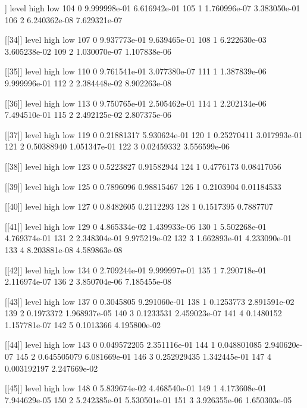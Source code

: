 \documentclass[letterpaper,10pt]{amsart}
\newenvironment{verbatimcode}{\bigskip \scriptsize \verbatim}{\endverbatim \normalsize \bigskip}
\begin{document}
\begin{enumerate}[(1)]
\begin{verbatimcode}
[[33]]
    level         high          low
104     0 9.999998e-01 6.616942e-01
105     1 1.760996e-07 3.383050e-01
106     2 6.240362e-08 7.629321e-07

[[34]]
    level         high          low
107     0 9.937773e-01 9.639465e-01
108     1 6.222630e-03 3.605238e-02
109     2 1.030070e-07 1.107838e-06

[[35]]
    level         high          low
110     0 9.761541e-01 3.077380e-07
111     1 1.387839e-06 9.999996e-01
112     2 2.384448e-02 8.902263e-08

[[36]]
    level         high          low
113     0 9.750765e-01 2.505462e-01
114     1 2.202134e-06 7.494510e-01
115     2 2.492125e-02 2.807375e-06

[[37]]
    level       high          low
119     0 0.21881317 5.930624e-01
120     1 0.25270411 3.017993e-01
121     2 0.50388940 1.051347e-01
122     3 0.02459332 3.556599e-06

[[38]]
    level      high        low
123     0 0.5223827 0.91582944
124     1 0.4776173 0.08417056

[[39]]
    level      high        low
125     0 0.7896096 0.98815467
126     1 0.2103904 0.01184533

[[40]]
    level      high       low
127     0 0.8482605 0.2112293
128     1 0.1517395 0.7887707

[[41]]
    level         high          low
129     0 4.865334e-02 1.439933e-06
130     1 5.502268e-01 4.769374e-01
131     2 2.348304e-01 9.975219e-02
132     3 1.662893e-01 4.233090e-01
133     4 8.203881e-08 4.589863e-08

[[42]]
    level         high          low
134     0 2.709244e-01 9.999997e-01
135     1 7.290718e-01 2.116974e-07
136     2 3.850704e-06 7.185455e-08

[[43]]
    level      high          low
137     0 0.3045805 9.291060e-01
138     1 0.1253773 2.891591e-02
139     2 0.1973372 1.968937e-05
140     3 0.1233531 2.459023e-07
141     4 0.1480152 1.157781e-07
142     5 0.1013366 4.195800e-02

[[44]]
    level        high          low
143     0 0.049572205 2.351116e-01
144     1 0.048801085 2.940620e-07
145     2 0.645505079 6.081669e-01
146     3 0.252929435 1.342445e-01
147     4 0.003192197 2.247669e-02

[[45]]
    level         high          low
148     0 5.839674e-02 4.468540e-01
149     1 4.173608e-01 7.944629e-05
150     2 5.242385e-01 5.530501e-01
151     3 3.926355e-06 1.650303e-05


\end{verbatimcode}
\end{enumerate}
\end{document}
